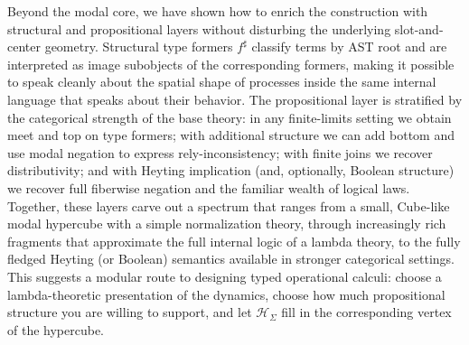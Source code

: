\documentclass[11pt]{article}
\theoremstyle{definition}
\theoremstyle{plain}
\theoremstyle{remark}
\theoremstyle{plain}
\begin{document}
Beyond the modal core, we have shown how to enrich the construction with structural and propositional layers without disturbing the underlying slot-and-center geometry. Structural type formers $f^\sharp$ classify terms by AST root and are interpreted as image subobjects of the corresponding formers, making it possible to speak cleanly about the spatial shape of processes inside the same internal language that speaks about their behavior. The propositional layer is stratified by the categorical strength of the base theory: in any finite-limits setting we obtain meet and top on type formers; with additional structure we can add bottom and use modal negation to express rely-inconsistency; with finite joins we recover distributivity; and with Heyting implication (and, optionally, Boolean structure) we recover full fiberwise negation and the familiar wealth of logical laws. Together, these layers carve out a spectrum that ranges from a small, Cube-like modal hypercube with a simple normalization theory, through increasingly rich fragments that approximate the full internal logic of a lambda theory, to the fully fledged Heyting (or Boolean) semantics available in stronger categorical settings\cite{WilliamsStay2022}. This suggests a modular route to designing typed operational calculi: choose a lambda-theoretic presentation of the dynamics, choose how much propositional structure you are willing to support, and let $\mathcal{H}_\Sigma$ fill in the corresponding vertex of the hypercube.
\end{document}
